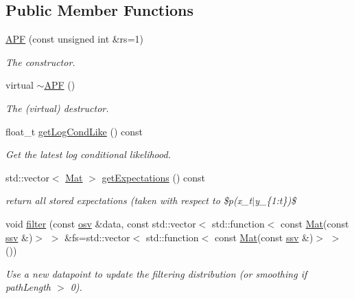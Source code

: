 \subsection*{Public Member Functions}
\begin{DoxyCompactItemize}
\item 
\hyperlink{classAPF_af11ebba0fda9017d21f5d88521584210}{A\+PF} (const unsigned int \&rs=1)
\begin{DoxyCompactList}\small\item\em The constructor. \end{DoxyCompactList}\item 
\mbox{\label{classAPF_a5f7a82bbf9d74f93c3d6ebea5f5bf95f}} 
virtual \hyperlink{classAPF_a5f7a82bbf9d74f93c3d6ebea5f5bf95f}{$\sim$\+A\+PF} ()
\begin{DoxyCompactList}\small\item\em The (virtual) destructor. \end{DoxyCompactList}\item 
float\+\_\+t \hyperlink{classAPF_adc35c009dcf5b3289a4d46279527e024}{get\+Log\+Cond\+Like} () const
\begin{DoxyCompactList}\small\item\em Get the latest log conditional likelihood. \end{DoxyCompactList}\item 
std\+::vector$<$ \hyperlink{classAPF_a448066ff44c8afb24c89bcea11d604c6}{Mat} $>$ \hyperlink{classAPF_a5185ce1aa918dcf176bd0a3ecf6b03dd}{get\+Expectations} () const
\begin{DoxyCompactList}\small\item\em return all stored expectations (taken with respect to \$p(x\+\_\+t$\vert$y\+\_\+\{1\+:t\})\$ \end{DoxyCompactList}\item 
void \hyperlink{classAPF_ab97631b9df8b63e830070604e6887b42}{filter} (const \hyperlink{classAPF_aa8ac25c475e54ddf21999f28727a049e}{osv} \&data, const std\+::vector$<$ std\+::function$<$ const \hyperlink{classAPF_a448066ff44c8afb24c89bcea11d604c6}{Mat}(const \hyperlink{classAPF_a5f96da87f00ff75af1232f9021daf06a}{ssv} \&)$>$ $>$ \&fs=std\+::vector$<$ std\+::function$<$ const \hyperlink{classAPF_a448066ff44c8afb24c89bcea11d604c6}{Mat}(const \hyperlink{classAPF_a5f96da87f00ff75af1232f9021daf06a}{ssv} \&)$>$ $>$())
\begin{DoxyCompactList}\small\item\em Use a new datapoint to update the filtering distribution (or smoothing if path\+Length $>$ 0). \end{DoxyCompactList}\item 

\end{DoxyCompactItemize}
